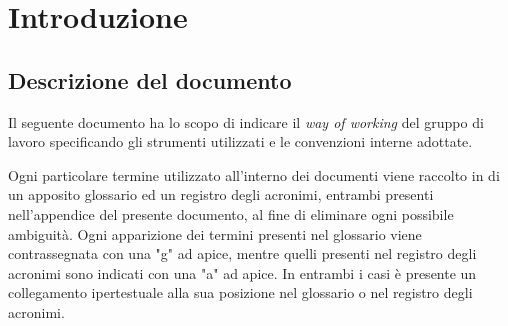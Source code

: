 \section{Introduzione}
\subsection{Descrizione del documento}
Il  seguente documento ha lo scopo di indicare il \textit{way of working} del gruppo di lavoro specificando gli strumenti utilizzati e le convenzioni interne adottate.

Ogni particolare termine utilizzato all'interno dei documenti viene raccolto in di un apposito glossario ed un registro degli acronimi, entrambi presenti nell'appendice del presente documento, al fine di eliminare ogni possibile ambiguità.
Ogni apparizione dei termini presenti nel glossario viene contrassegnata con una "g" ad apice, mentre quelli presenti nel registro degli acronimi sono indicati con una "a" ad apice. 
In entrambi i casi è presente un collegamento ipertestuale alla sua posizione nel glossario o nel registro degli acronimi.